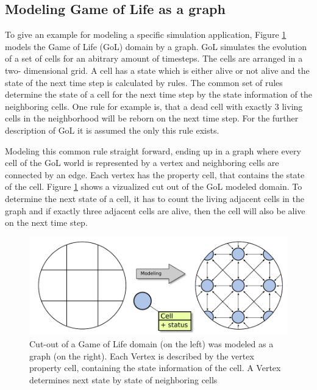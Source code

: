 \subsection{Modeling Game of Life as a graph}
\label{sec:gol}
To give an example for modeling a specific simulation application,
Figure \ref{fig:gol} models the Game of Life (GoL) \cite{ref:gol}
domain by a graph. GoL simulates the evolution of a set of cells for
an abitrary amount of timesteps. The cells are arranged in a two-
dimensional grid.  A cell has a state which is either alive or not
alive and the state of the next time step is calculated by
rules. The common set of rules determine the state of a cell for the
next time step by the state information of the neighboring cells. One
rule for example is, that a dead cell with exactly 3 living cells in
the neighborhood will be reborn on the next time step. For the further
description of GoL it is assumed the only this rule exists.


Modeling this common rule straight forward, ending up in a graph where
every cell of the GoL world is represented by a vertex and neighboring
cells are connected by an edge. Each vertex has the property cell, that
contains the state of the cell. Figure \ref{fig:gol} shows a vizualized
cut out of the GoL modeled domain. To determine the next state of a 
cell, it has to count the living adjacent cells in the graph and if
exactly three adjacent cells are alive, then the cell will also be
alive on the next time step.

\begin{figure}[H]
  \centering \includegraphics[width=\textwidth]{graphics/30_gol}
  \caption{Cut-out of a Game of Life domain (on the left) was modeled
    as a graph (on the right). Each Vertex is described by the vertex
    property cell, containing the state information of the cell. A
    Vertex determines next state by state of neighboring cells}
  \label{fig:gol}
\end{figure}

